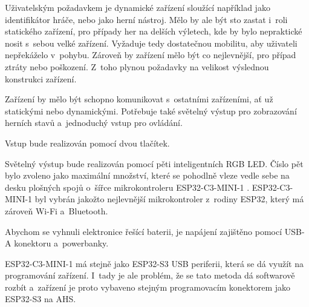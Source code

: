 Uživatelským požadavkem je dynamické zařízení sloužící například jako identifikátor hráče, nebo jako herní nástroj.
Mělo by ale být sto zastat i~roli statického zařízení, pro případy her na delších výletech, kde by bylo nepraktické nosit s~sebou velké zařízení.
Vyžaduje tedy dostatečnou mobilitu, aby uživateli nepřekáželo v~pohybu.
Zároveň by zařízení mělo být co nejlevnější, pro případ ztráty nebo poškození.
Z~toho plynou požadavky na velikost výslednou konstrukci zařízení.

Zařízení by mělo být schopno komunikovat s~ostatními zařízeními, ať už statickými nebo dynamickými.
Potřebuje také světelný výstup pro zobrazování herních stavů a~jednoduchý vstup pro ovládání.

Vstup bude realizován pomocí dvou tlačítek.

Světelný výstup bude realizován pomocí pěti inteligentních RGB LED.
Číslo pět bylo zvoleno jako maximální množství, které se pohodlně vleze vedle sebe na desku plošných spojů o~šířce mikrokontroleru ESP32-C3-MINI-1 \cite{ESP32C3}.
ESP32-C3-MINI-1 byl vybrán jakožto nejlevnější mikrokontroler z~rodiny ESP32, který má zároveň Wi-Fi a~Bluetooth.

Abychom se vyhnuli elektronice řešící baterii, je napájení zajištěno pomocí USB-A konektoru a~powerbanky.

ESP32-C3-MINI-1 má stejně jako ESP32-S3 USB periferii, která se dá využít na programování zařízení.
I~tady je ale problém, že se tato metoda dá softwarově rozbít a~zařízení je proto vybaveno stejným programovacím konektorem jako ESP32-S3 na AHS.





